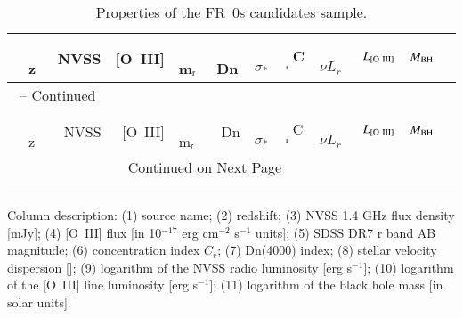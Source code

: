 \onecolumn
\begin{center}
\begin{longtable}{l l r r l l l l l c l c}

\caption[Properties of the FR~0s candidates sample.]{Properties of the FR~0s candidates sample.} 
\label{tab} \\

\hline \hline 
&  \,\,\,\,\,z & NVSS & [O~III] & \,\,\,\,\,m$_{\rm r}$ & \,\,Dn & \,\,\,$\sigma_*$ & \,\,\,C$_{\rm r}$ & \,\,\,\, $\nu L_r$ &  $L_{\rm[O~III]}$ & $M_{\rm BH}$ \\
\hline	
\endfirsthead

\multicolumn{3}{c}{{\tablename} \thetable{} -- Continued} \\[0.5ex]
\hline \hline 
& \,\,\,\,\,z & NVSS & [O~III] & \,\,\,\,\,m$_{\rm r}$ & \,\,Dn & \,\,\,$\sigma_*$ & \,\,\,C$_{\rm r}$ & \,\,\,\, $\nu L_r$ &  $L_{\rm[O~III]}$ & $M_{\rm BH}$ \\
\hline
\endhead

\hline
  \multicolumn{10}{c}{{Continued on Next Page}} \\
\endfoot

  \\[-1.8ex] 
\endlastfoot


\hline
\hline
\end{longtable}
\end{center}
Column description: (1) source name; (2) redshift; (3) NVSS 1.4 GHz
flux density [mJy]; (4) [O~III] flux [in 10$^{-17}$ erg cm$^{-2}$
s$^{-1}$ units]; (5) SDSS DR7 r band AB magnitude; (6) concentration
index $C_r$; (7) Dn(4000) index; (8) stellar velocity dispersion
[\kms]; (9) logarithm of the NVSS radio luminosity [erg s$^{-1}$];
(10) logarithm of the [O~III] line luminosity [erg s$^{-1}$]; (11)
logarithm of the black hole mass [in solar units].  \twocolumn

